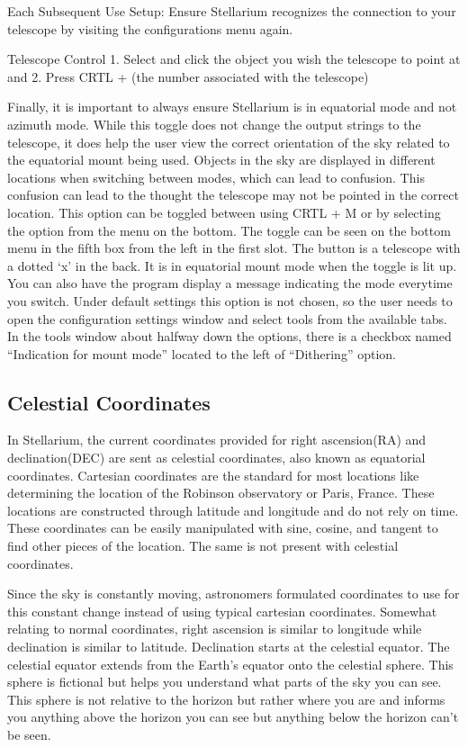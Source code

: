 \documentclass[12pt]{report}
\begin{document}
Each Subsequent Use Setup: Ensure Stellarium recognizes the connection to your telescope by visiting the configurations menu again.

Telescope Control
	1. Select and click the object you wish the telescope to point at and
	2. Press CRTL + (the number associated with the telescope)

Finally, it is important to always ensure Stellarium is in equatorial mode and not azimuth mode. While this toggle does not change the output strings to the telescope, it does help the user view the correct orientation of the sky related to the equatorial mount being used. Objects in the sky are displayed in different locations when switching between modes, which can lead to confusion. This confusion can lead to the thought the telescope may not be pointed in the correct location. This option can be toggled between using CRTL + M or by selecting the option from the menu on the bottom. The toggle can be seen on the bottom menu in the fifth box from the left in the first slot. The button is a telescope with a dotted ‘x’ in the back. It is in equatorial mount mode when the toggle is lit up. You can also have the program display a message indicating the mode everytime you switch. Under default settings this option is not chosen, so the user needs to open the configuration settings window and select tools from the available tabs. In the tools window about halfway down the options, there is a checkbox named “Indication for mount mode” located to the left of “Dithering” option.

\subsection*{Celestial Coordinates}

In Stellarium, the current coordinates provided for right ascension(RA) and declination(DEC) are sent as celestial coordinates, also known as equatorial coordinates. Cartesian coordinates are the standard for most locations like determining the location of the Robinson observatory or Paris, France. These locations are constructed through latitude and longitude and do not rely on time. These coordinates can be easily manipulated with sine, cosine, and tangent to find other pieces of the location. The same is not present with celestial coordinates.

Since the sky is constantly moving, astronomers formulated coordinates to use for this constant change instead of using typical cartesian coordinates. Somewhat relating to normal coordinates, right ascension is similar to longitude while declination is similar to latitude. Declination starts at the celestial equator. The celestial equator extends from the Earth’s equator onto the celestial sphere. This sphere is fictional but helps you understand what parts of the sky you can see. This sphere is not relative to the horizon but rather where you are and informs you anything above the horizon you can see but anything below the horizon can’t be seen.
\end{document}

